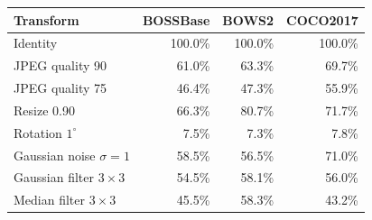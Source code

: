 \begin{tabular}{lrrr}
\toprule
\textbf{Transform} & \textbf{BOSSBase} & \textbf{BOWS2} & \textbf{COCO2017} \\
\midrule
Identity & 100.0\% & 100.0\% & 100.0\% \\
JPEG quality 90 & 61.0\% & 63.3\% & 69.7\% \\
JPEG quality 75 & 46.4\% & 47.3\% & 55.9\% \\
Resize 0.90 & 66.3\% & 80.7\% & 71.7\% \\
Rotation $1^\circ$ & 7.5\% & 7.3\% & 7.8\% \\
Gaussian noise $\sigma{=}1$ & 58.5\% & 56.5\% & 71.0\% \\
Gaussian filter $3\times3$ & 54.5\% & 58.1\% & 56.0\% \\
Median filter $3\times3$ & 45.5\% & 58.3\% & 43.2\% \\
\bottomrule
\end{tabular}
